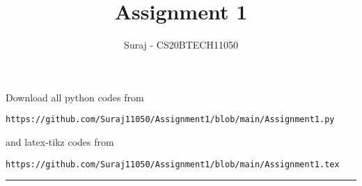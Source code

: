 \documentclass[journal,12pt,twocolumn]{IEEEtran}
\DeclareMathOperator*{\Res}{Res}
\begin{document}
\newcommand{\BEQA}{\begin{eqnarray}}
\newcommand{\EEQA}{\end{eqnarray}}
\newcommand{\define}{\stackrel{\triangle}{=}}

\raggedbottom
\setlength{\parindent}{0pt}
\providecommand{\mbf}{\mathbf}
\providecommand{\pr}[1]{\ensuremath{\Pr\left(#1\right)}}
\providecommand{\qfunc}[1]{\ensuremath{Q\left(#1\right)}}
\providecommand{\sbrak}[1]{\ensuremath{{}\left[#1\right]}}
\providecommand{\lsbrak}[1]{\ensuremath{{}\left[#1\right.}}
\providecommand{\rsbrak}[1]{\ensuremath{{}\left.#1\right]}}
\providecommand{\brak}[1]{\ensuremath{\left(#1\right)}}
\providecommand{\lbrak}[1]{\ensuremath{\left(#1\right.}}
\providecommand{\rbrak}[1]{\ensuremath{\left.#1\right)}}
\providecommand{\cbrak}[1]{\ensuremath{\left\{#1\right\}}}
\providecommand{\lcbrak}[1]{\ensuremath{\left\{#1\right.}}
\providecommand{\rcbrak}[1]{\ensuremath{\left.#1\right\}}}
\theoremstyle{remark}
\newtheorem{rem}{Remark}
\newcommand{\sgn}{\mathop{\mathrm{sgn}}}
\providecommand{\abs}[1]{\vert#1\vert}
\providecommand{\res}[1]{\Res\displaylimits_{#1}} 
\providecommand{\norm}[1]{\lVert#1\rVert}
\providecommand{\mtx}[1]{\mathbf{#1}}
\providecommand{\mean}[1]{E[ #1 ]}
\providecommand{\fourier}{\overset{\mathcal{F}}{ \rightleftharpoons}}
\providecommand{\system}{\overset{\mathcal{H}}{ \longleftrightarrow}}
\newcommand{\solution}{\noindent \textbf{Solution: }}
\newcommand{\cosec}{\,\text{cosec}\,}
\providecommand{\dec}[2]{\ensuremath{\overset{#1}{\underset{#2}{\gtrless}}}}
\newcommand{\myvec}[1]{\ensuremath{\begin{pmatrix}#1\end{pmatrix}}}
\newcommand{\mydet}[1]{\ensuremath{\begin{vmatrix}#1\end{vmatrix}}}
\makeatletter
{}
\makeatother
\let\StandardTheFigure\thefigure
\let\vec\mathbf
\renewcommand{\thefigure}{\theproblem}
\def\putbox#1#2#3{\makebox[0in][l]{\makebox[#1][l]{}\raisebox{\baselineskip}[0in][0in]{\raisebox{#2}[0in][0in]{#3}}}}
     \def\rightbox#1{\makebox[0in][r]{#1}}
     \def\centbox#1{\makebox[0in]{#1}}
     \def\topbox#1{\raisebox{-\baselineskip}[0in][0in]{#1}}
     \def\midbox#1{\raisebox{-0.5\baselineskip}[0in][0in]{#1}}
\vspace{3cm}
\title{Assignment 1}
\author{Suraj - CS20BTECH11050}
\maketitle
\newpage
\bigskip
\renewcommand{\thefigure}{\theenumi}
\renewcommand{\thetable}{\theenumi}
Download all python codes from 
\begin{lstlisting}
https://github.com/Suraj11050/Assignment1/blob/main/Assignment1.py
\end{lstlisting}
%
and latex-tikz codes from 
%
\begin{lstlisting}
https://github.com/Suraj11050/Assignment1/blob/main/Assignment1.tex
\end{lstlisting}
%
\hrule
%
\end{document}

